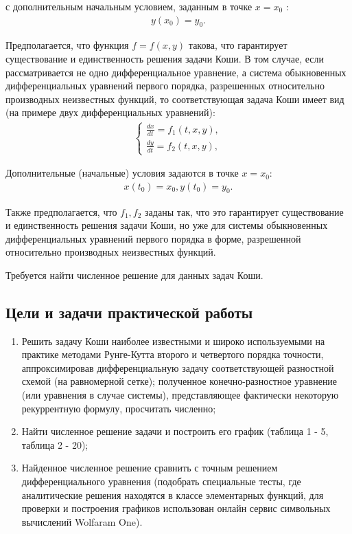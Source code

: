 \documentclass[a4paper,12pt,titlepage,finall]{article}
\begin{document}
с дополнительным начальным условием, заданным в точке $x = x_0$ :
\begin{align*}
y(x_0)=y_0.
\end{align*}

Предполагается, что  функция $f = f (x, y)$ такова, что
гарантирует существование и единственность решения задачи Коши.
В том случае, если рассматривается не одно дифференциальное уравнение, а система обыкновенных дифференциальных уравнений первого порядка,
разрешенных
относительно
производных
неизвестных
функций, то
соответствующая задача Коши имеет вид (на примере двух дифференциальных
уравнений):
\begin{align*}
\begin{cases}
\frac{dx}{dt}=f_1(t,x,y),\\
\frac{dy}{dt}=f_2(t,x,y),
\end{cases}
\end{align*}
\par
Дополнительные (начальные) условия задаются в точке $x = x_0$:
\begin{align*}
x(t_0) = x_0, y(t_0)=y_0.
\end{align*}

Также предполагается, что $f_1, f_2$ заданы так, что это
гарантирует существование и единственность решения задачи Коши, но
уже для системы обыкновенных дифференциальных уравнений первого порядка в
форме, разрешенной относительно производных неизвестных функций.
\par
Требуется найти численное решение для данных задач Коши.

\subsection{Цели и задачи практической работы}
\begin{enumerate}
\item
Решить задачу Коши наиболее известными и широко
используемыми на практике методами Рунге-Кутта второго и четвертого
порядка
точности,
аппроксимировав
дифференциальную
задачу
соответствующей разностной схемой (на равномерной сетке); полученное
конечно-разностное уравнение (или уравнения в случае системы),
представляющее фактически некоторую рекуррентную формулу, просчитать
численно;
\item
Найти численное решение задачи и построить его график (таблица 1 - 5, таблица 2 - 20);
\item
Найденное численное решение сравнить с точным решением
дифференциального уравнения (подобрать специальные тесты, где
аналитические решения находятся в классе элементарных функций, для проверки и построения графиков использован онлайн сервис символьных вычислений Wolfaram One).

\end{enumerate}
\newpage
\end{document}
